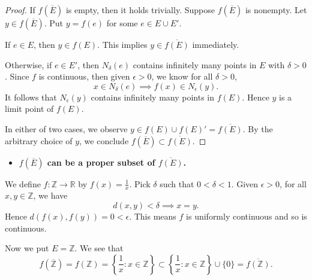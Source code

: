 \begin{Exercise}
	\begin{proof}
		If $f(\overline{E})$ is empty, then it holds trivially. Suppose $f(\overline{E})$ is nonempty. Let $y\in f(\overline{E})$. Put $y=f(e)$ for some $e\in E\cup E'$.
		
		If $e\in E$, then $y\in f(E)$. This implies $y\in\overline{f(E)}$ immediately.
		
		Otherwise, if $e\in E'$, then $N_{\delta}(e)$ contains infinitely many points in $E$ with $\delta>0$. Since $f$ is continuous, then given $\epsilon>0$, we know for all $\delta>0$,
		$$
		x\in N_{\delta}(e) \implies f(x)\in N_{\epsilon}(y).
		$$
		It follows that $N_{\epsilon}(y)$ contains infinitely many points in $f(E)$. Hence $y$ is a limit point of $f(E)$.
		
		In either of two cases, we observe $y\in f(E)\cup f(E)' = \overline{f(E)}$. By the arbitrary choice of $y$, we conclude $f(\overline{E})\subset \overline{f(E)}$.
	\end{proof}
	
	\begin{itemize}
		\item \textbf{$f(\overline{E})$ can be a proper subset of $\overline{f(E)}$.}
	\end{itemize}
	\begin{solution}
		We define $f:\mathbb{Z}\to\mathbb{R}$ by $f(x) = \frac{1}{x}$. Pick $\delta$ such that $0 < \delta < 1$. Given $\epsilon>0$, for all $x,y\in \mathbb{Z}$, we have
		$$
		d(x,y)< \delta \implies x = y.
		$$
		Hence $d(f(x),f(y)) = 0 < \epsilon$. This means $f$ is uniformly continuous and so is continuous.
		
		Now we put $E = \mathbb{Z}$. We see that
		$$
		f(\overline{\mathbb{Z}}) 
		= f(\mathbb{Z}) 
		= \left\{ \frac{1}{x} : x\in\mathbb{Z} \right\}
		\subset \left\{ \frac{1}{x} : x\in\mathbb{Z} \right\} \cup \{0\}
		= \overline{f(\mathbb{Z})}.
		$$
	\end{solution}
\end{Exercise}